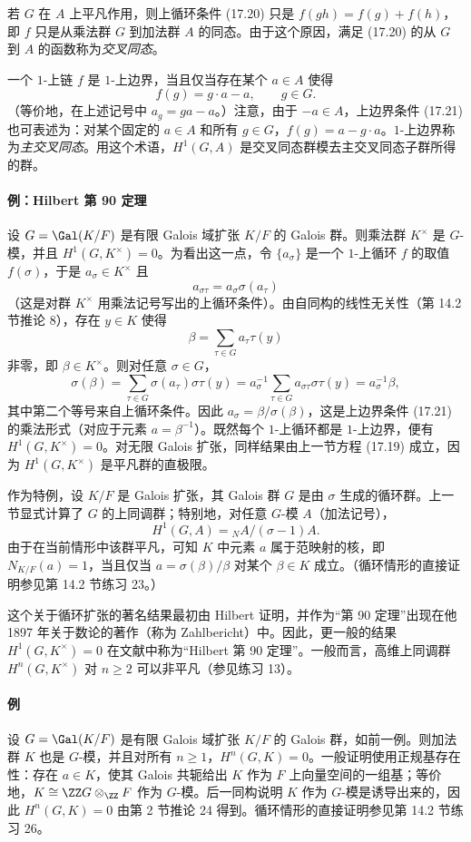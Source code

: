 若 $G$ 在 $A$ 上平凡作用，则上循环条件 (17.20) 只是 $f(gh)=f(g)+f(h)$，即 $f$ 只是从乘法群 $G$ 到加法群 $A$ 的同态。由于这个原因，满足 (17.20) 的从 $G$ 到 $A$ 的函数称为\emph{交叉同态}。

一个 $1$-上链 $f$ 是 $1$-上边界，当且仅当存在某个 $a\in A$ 使得
\[
  f(g)=g\cdot a-a,
  \qquad g\in G.
  \tag{17.21}
\]
（等价地，在上述记号中 $a_g=ga-a$。）注意，由于 $-a\in A$，上边界条件 (17.21) 也可表述为：对某个固定的 $a\in A$ 和所有 $g\in G$，$f(g)=a-g\cdot a$。$1$-上边界称为\emph{主交叉同态}。用这个术语，$H^1(G,A)$ 是交叉同态群模去主交叉同态子群所得的群。

\paragraph{例：Hilbert 第 90 定理}
设 $G=\Gal(K/F)$ 是有限 Galois 域扩张 $K/F$ 的 Galois 群。则乘法群 $K^\times$ 是 $G$-模，并且 $H^1(G,K^\times)=0$。为看出这一点，令 $\{a_\sigma\}$ 是一个 $1$-上循环 $f$ 的取值 $f(\sigma)$，于是 $a_\sigma\in K^\times$ 且
\[
  a_{\sigma\tau}=a_\sigma\sigma(a_\tau)
\]
（这是对群 $K^\times$ 用乘法记号写出的上循环条件）。由自同构的线性无关性（第 14.2 节推论 8），存在 $y\in K$ 使得
\[
  \beta=\sum_{\tau\in G}a_\tau\tau(y)
\]
非零，即 $\beta\in K^\times$。则对任意 $\sigma\in G$，
\[
  \sigma(\beta)=\sum_{\tau\in G}\sigma(a_\tau)\sigma\tau(y)=a_\sigma^{-1}\sum_{\tau\in G}a_{\sigma\tau}\sigma\tau(y)=a_\sigma^{-1}\beta,
\]
其中第二个等号来自上循环条件。因此 $a_\sigma=\beta/\sigma(\beta)$，这是上边界条件 (17.21) 的乘法形式（对应于元素 $a=\beta^{-1}$）。既然每个 $1$-上循环都是 $1$-上边界，便有 $H^1(G,K^\times)=0$。对无限 Galois 扩张，同样结果由上一节方程 (17.19) 成立，因为 $H^1(G,K^\times)$ 是平凡群的直极限。

作为特例，设 $K/F$ 是 Galois 扩张，其 Galois 群 $G$ 是由 $\sigma$ 生成的循环群。上一节显式计算了 $G$ 的上同调群；特别地，对任意 $G$-模 $A$（加法记号），
\[
  H^1(G,A)={}_NA/(\sigma-1)A.
\]
由于在当前情形中该群平凡，可知 $K$ 中元素 $a$ 属于范映射的核，即 $N_{K/F}(a)=1$，当且仅当 $a=\sigma(\beta)/\beta$ 对某个 $\beta\in K$ 成立。（循环情形的直接证明参见第 14.2 节练习 23。）

这个关于循环扩张的著名结果最初由 Hilbert 证明，并作为“第 90 定理”出现在他 1897 年关于数论的著作（称为 Zahlbericht）中。因此，更一般的结果 $H^1(G,K^\times)=0$ 在文献中称为“Hilbert 第 90 定理”。一般而言，高维上同调群 $H^n(G,K^\times)$ 对 $n\geq2$ 可以非平凡（参见练习 13）。

\paragraph{例}
设 $G=\Gal(K/F)$ 是有限 Galois 域扩张 $K/F$ 的 Galois 群，如前一例。则加法群 $K$ 也是 $G$-模，并且对所有 $n\geq1$，$H^n(G,K)=0$。一般证明使用正规基存在性：存在 $a\in K$，使其 Galois 共轭给出 $K$ 作为 $F$ 上向量空间的一组基；等价地，$K\cong\ZZ G\otimes_{\ZZ}F$ 作为 $G$-模。后一同构说明 $K$ 作为 $G$-模是诱导出来的，因此 $H^n(G,K)=0$ 由第 2 节推论 24 得到。循环情形的直接证明参见第 14.2 节练习 26。

